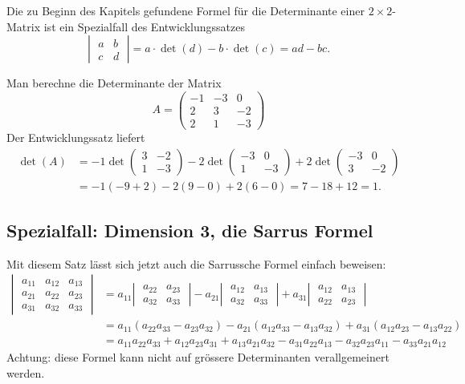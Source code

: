 \begin{beispiel}Die zu Beginn des Kapitels gefundene Formel für
die Determinante einer $2\times 2$-Matrix ist ein Spezialfall
des Entwicklungssatzes
\[
\left|\;
\begin{matrix}
a&b\\c&d
\end{matrix}
\;\right|
=a\cdot\det(d)-b\cdot\det(c)=ad-bc.
\]
\end{beispiel}

\begin{beispiel}
Man berechne die Determinante der Matrix
\[
A=\begin{pmatrix}
-1&-3&0\\
2&3&-2\\
2&1&-3
\end{pmatrix}
\]
Der Entwicklungssatz liefert
\begin{align*}
\det(A)&=
-1\det\begin{pmatrix}3&-2\\1&-3\end{pmatrix}
-2\det\begin{pmatrix}-3&0\\1&-3\end{pmatrix}
+2\det\begin{pmatrix}-3&0\\3&-2\end{pmatrix}
\\
&=
-1(-9+2)-2(9-0)+2(6-0)=7-18+12=1.
\end{align*}
\end{beispiel}

\subsection{Spezialfall: Dimension 3, die Sarrus Formel}
Mit diesem Satz lässt sich jetzt auch die Sarrussche Formel einfach beweisen:
\begin{align*}
\left|\;
\begin{matrix}
a_{11}&a_{12}&a_{13}\\
a_{21}&a_{22}&a_{23}\\
a_{31}&a_{32}&a_{33}
\end{matrix}\;\right|
&=
a_{11}
\left|\;\begin{matrix}
a_{22}&a_{23}\\
a_{32}&a_{33}
\end{matrix}\;\right|
-
a_{21}
\left|\;\begin{matrix}
a_{12}&a_{13}\\
a_{32}&a_{33}
\end{matrix}\;\right|
+
a_{31}
\left|\;\begin{matrix}
a_{12}&a_{13}\\
a_{22}&a_{23}
\end{matrix}\;\right|
\\
&=a_{11}(a_{22}a_{33}-a_{23}a_{32})
-a_{21}(a_{12}a_{33}-a_{13}a_{32})
+a_{31}(a_{12}a_{23}-a_{13}a_{22})
\\
&=
a_{11}a_{22}a_{33}+a_{12}a_{23}a_{31}+a_{13}a_{21}a_{32}
-a_{31}a_{22}a_{13}-a_{32}a_{23}a_{11}-a_{33}a_{21}a_{12}
\end{align*}
Achtung: diese Formel kann nicht auf grössere Determinanten
verallgemeinert werden.

